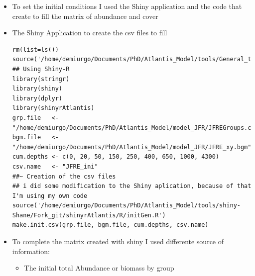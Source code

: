 \documentclass[11pt]{article}
\begin{document}
\begin{itemize}
\item To set the initial conditions I used the Shiny application and the code that create to fill the matrix of abundance and cover
\item The Shiny Application to create the csv files to fill

\begin{verbatim}
rm(list=ls())
source('/home/demiurgo/Documents/PhD/Atlantis_Model/tools/General_tools/Atlantis_tools.R')
## Using Shiny-R
library(stringr)
library(shiny)
library(dplyr)
library(shinyrAtlantis)
grp.file   <- "/home/demiurgo/Documents/PhD/Atlantis_Model/model_JFR/JFREGroups.csv"
bgm.file   <- "/home/demiurgo/Documents/PhD/Atlantis_Model/model_JFR/JFRE_xy.bgm"
cum.depths <- c(0, 20, 50, 150, 250, 400, 650, 1000, 4300)
csv.name   <- "JFRE_ini"
##~ Creation of the csv files
## i did some modification to the Shiny aplication, because of that I'm using my own code
source('/home/demiurgo/Documents/PhD/Atlantis_Model/tools/shiny-Shane/Fork_git/shinyrAtlantis/R/initGen.R')
make.init.csv(grp.file, bgm.file, cum.depths, csv.name)
\end{verbatim}
\item To complete the matrix created with shiny I used differente source of information:
\begin{itemize}
\item The initial total Abundance or biomass by group


\end{itemize}
\end{itemize}
\end{document}
